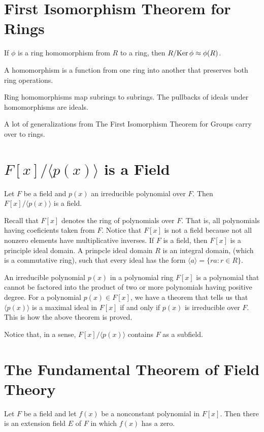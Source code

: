 \documentclass{article}
\begin{document}
\section*{First Isomorphism Theorem for Rings}

If $\phi$ is a ring homomorphism from $R$ to a ring,
then $R/\mbox{Ker}\,\phi\approx\phi(R)$.

A homomorphism is a function from one ring into
another that preserves both ring operations.

Ring homomorphisms map subrings to subrings.
The pullbacks of ideals under homomorphisms are ideals.

A lot of generalizations from The First Isomorphism
Theorem for Groups carry over to rings.

\section*{$F[x]/\langle p(x)\rangle$ is a Field}

Let $F$ be a field and $p(x)$ an irreducible polynomial over $F$.
Then $F[x]/\langle p(x)\rangle$ is a field.

Recall that $F[x]$ denotes the ring of polynomials over
$F$.  That is, all polynomials having coeficients taken
from $F$.  Notice that $F[x]$ is not a field because
not all nonzero elements have multiplicative inverses.
If $F$ is a field, then $F[x]$ is a principle ideal domain.
A prinpcle ideal domain $R$ is an integral domain, (which
is a commutative ring), such that every ideal
has the form $\langle a\rangle=\{ra:r\in R\}$.

An irreducible polynomial $p(x)$ in a polynomial ring $F[x]$
is a polynomial that cannot be factored into the product
of two or more polynomials having positive degree.
For a polynomial $p(x)\in F[x]$, we have a theorem that
tells us that $\langle p(x)\rangle$ is a maximal ideal
in $F[x]$ if and only if $p(x)$ is irreducible over $F$.
This is how the above theorem is proved.

Notice that, in a sense, $F[x]/\langle p(x)\rangle$
contains $F$ as a subfield.

\section*{The Fundamental Theorem of Field Theory}

Let $F$ be a field and let $f(x)$ be a nonconstant
polynomial in $F[x]$.  Then there is an extension field
$E$ of $F$ in which $f(x)$ has a zero.
\end{document}
